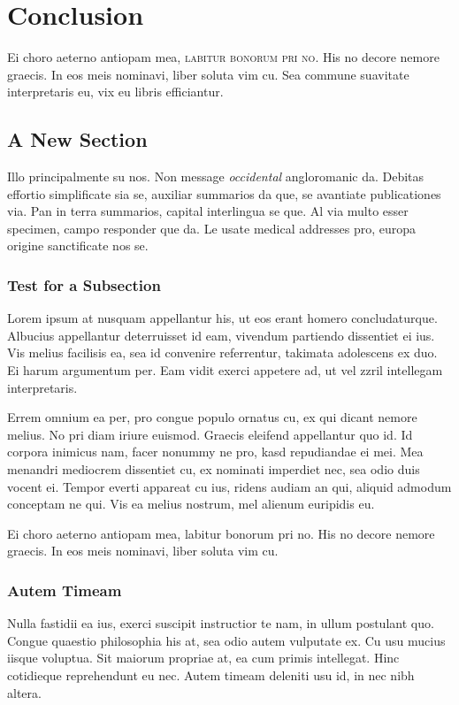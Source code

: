 \chapter{Conclusion}\label{ch:conclusion}
Ei choro aeterno antiopam mea, {\scshape labitur bonorum pri no}. His no decore
nemore graecis. In eos meis nominavi, liber soluta vim cu. Sea commune
suavitate interpretaris eu, vix eu libris efficiantur.
\section{A New Section}

Illo principalmente su nos. Non message \emph{occidental} angloromanic
da. Debitas effortio simplificate sia se, auxiliar summarios da que,
se avantiate publicationes via. Pan in terra summarios, capital
interlingua se que. Al via multo esser specimen, campo responder que
da. Le usate medical addresses pro, europa origine sanctificate nos
se.

\subsection{Test for a Subsection}
Lorem ipsum at nusquam appellantur his, ut eos erant homero
concludaturque. Albucius appellantur deterruisset id eam, vivendum
partiendo dissentiet ei ius. Vis melius facilisis ea, sea id convenire
referrentur, takimata adolescens ex duo. Ei harum argumentum per. Eam
vidit exerci appetere ad, ut vel zzril intellegam interpretaris.

Errem omnium ea per, pro congue populo ornatus cu, ex qui
dicant nemore melius. No pri diam iriure euismod. Graecis eleifend
appellantur quo id. Id corpora inimicus nam, facer nonummy ne pro,
kasd repudiandae ei mei. Mea menandri mediocrem dissentiet cu, ex
nominati imperdiet nec, sea odio duis vocent ei. Tempor everti
appareat cu ius, ridens audiam an qui, aliquid admodum conceptam ne
qui. Vis ea melius nostrum, mel alienum euripidis eu.

Ei choro aeterno antiopam mea, labitur bonorum pri no. His no decore
nemore graecis. In eos meis nominavi, liber soluta vim cu.

\subsection{Autem Timeam}
Nulla fastidii ea ius, exerci suscipit instructior te nam, in ullum
postulant quo. Congue quaestio philosophia his at, sea odio autem
vulputate ex. Cu usu mucius iisque voluptua. Sit maiorum propriae at,
ea cum  primis intellegat. Hinc cotidieque reprehendunt eu
nec. Autem timeam deleniti usu id, in nec nibh altera.

